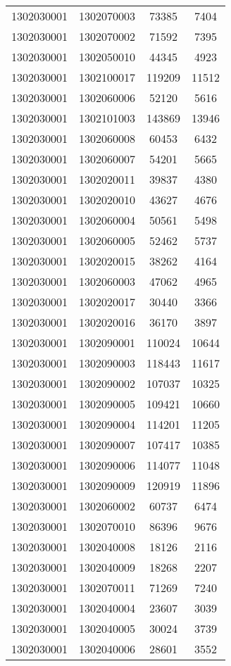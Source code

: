 \begin{longtable}[h]{llcc}
		1302030001 & 1302070003 & 73385 & 7404\\
		1302030001 & 1302070002 & 71592 & 7395\\
		1302030001 & 1302050010 & 44345 & 4923\\
		1302030001 & 1302100017 & 119209 & 11512\\
		1302030001 & 1302060006 & 52120 & 5616\\
		1302030001 & 1302101003 & 143869 & 13946\\
		1302030001 & 1302060008 & 60453 & 6432\\
		1302030001 & 1302060007 & 54201 & 5665\\
		1302030001 & 1302020011 & 39837 & 4380\\
		1302030001 & 1302020010 & 43627 & 4676\\
		1302030001 & 1302060004 & 50561 & 5498\\
		1302030001 & 1302060005 & 52462 & 5737\\
		1302030001 & 1302020015 & 38262 & 4164\\
		1302030001 & 1302060003 & 47062 & 4965\\
		1302030001 & 1302020017 & 30440 & 3366\\
		1302030001 & 1302020016 & 36170 & 3897\\
		1302030001 & 1302090001 & 110024 & 10644\\
		1302030001 & 1302090003 & 118443 & 11617\\
		1302030001 & 1302090002 & 107037 & 10325\\
		1302030001 & 1302090005 & 109421 & 10660\\
		1302030001 & 1302090004 & 114201 & 11205\\
		1302030001 & 1302090007 & 107417 & 10385\\
		1302030001 & 1302090006 & 114077 & 11048\\
		1302030001 & 1302090009 & 120919 & 11896\\
		1302030001 & 1302060002 & 60737 & 6474\\
		1302030001 & 1302070010 & 86396 & 9676\\
		1302030001 & 1302040008 & 18126 & 2116\\
		1302030001 & 1302040009 & 18268 & 2207\\
		1302030001 & 1302070011 & 71269 & 7240\\
		1302030001 & 1302040004 & 23607 & 3039\\
		1302030001 & 1302040005 & 30024 & 3739\\
		1302030001 & 1302040006 & 28601 & 3552\\

\end{longtable}
